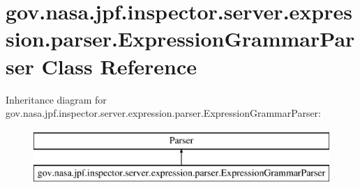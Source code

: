 \hypertarget{classgov_1_1nasa_1_1jpf_1_1inspector_1_1server_1_1expression_1_1parser_1_1_expression_grammar_parser}{}\section{gov.\+nasa.\+jpf.\+inspector.\+server.\+expression.\+parser.\+Expression\+Grammar\+Parser Class Reference}
\label{classgov_1_1nasa_1_1jpf_1_1inspector_1_1server_1_1expression_1_1parser_1_1_expression_grammar_parser}
Inheritance diagram for gov.\+nasa.\+jpf.\+inspector.\+server.\+expression.\+parser.\+Expression\+Grammar\+Parser\+:\begin{figure}[H]
\begin{center}
\leavevmode
\includegraphics[height=2.000000cm]{classgov_1_1nasa_1_1jpf_1_1inspector_1_1server_1_1expression_1_1parser_1_1_expression_grammar_parser}
\end{center}
\end{figure}
